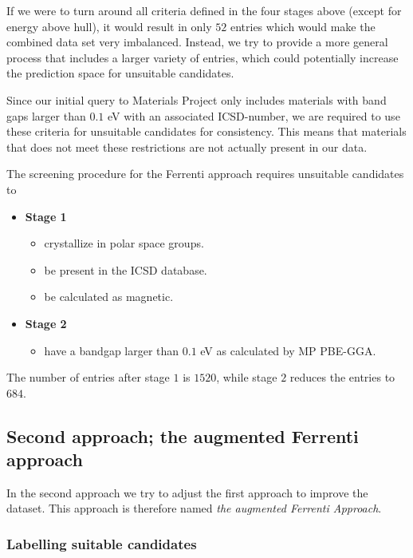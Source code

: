 If we were to turn around all criteria defined in the four stages above (except for energy above hull), it would result in only $52$ entries which would make the combined data set very imbalanced. Instead, we try to provide a more general process that includes a larger variety of entries, which could potentially increase the prediction space for unsuitable candidates.

Since our initial query to Materials Project only includes materials with band gaps larger than $0.1$ eV with an associated ICSD-number, we are required to use these criteria for unsuitable candidates for consistency. This means that materials that does not meet these restrictions are not actually present in our data.

The screening procedure for the Ferrenti approach requires unsuitable candidates to

\begin{itemize}
  \item[]{\textbf{Stage 1}}
  \begin{itemize}
  \item crystallize in polar space groups.
  \item be present in the ICSD database.
  \item be calculated as magnetic.
  \end{itemize}
  \item[]{\textbf{Stage 2}}
  \begin{itemize}
  \item have a bandgap larger than $0.1$ eV as calculated by MP PBE-GGA.
  \end{itemize}
\end{itemize}

The number of entries after stage $1$ is $1520$, while stage $2$ reduces the entries to $684$.

\subsection{Second approach; the augmented Ferrenti approach}

In the second approach we try to adjust the first approach to improve the dataset. This approach is therefore named \textit{the augmented Ferrenti Approach}.

\subsubsection{Labelling suitable candidates}

